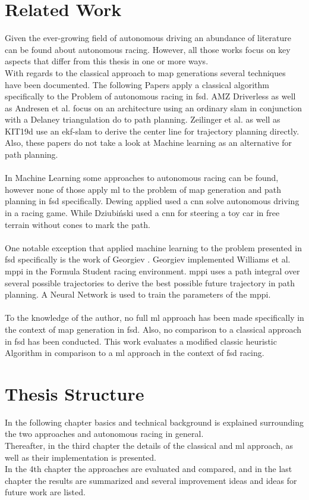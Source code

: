 \section{Related Work}
Given the ever-growing field of autonomous driving an abundance of literature can be found about autonomous racing. However, all those works focus on key aspects that differ from this thesis in one or more ways. \\
With regards to the classical approach to map generations several techniques have been documented. The following Papers apply a classical algorithm specifically to the Problem of autonomous racing in \ac{fsd}. AMZ Driverless \cite{kabzan2019amz} as well as Andresen et al. \cite{andresen2020} focus on an architecture using an ordinary \ac{slam} in conjunction with a Delaney triangulation do to path planning. Zeilinger et al. \cite{zeilinger2017} as well as KIT19d \cite{nekkah2020} use an \ac{ekf}-\ac{slam} to derive the center line for trajectory planning directly. Also, these papers do not take a look at Machine learning as an alternative for path planning.\\
\\
In Machine Learning some approaches to autonomous racing can be found, however none of those apply \ac{ml} to the problem of map generation and path planning in \ac{fsd} specifically. Dewing \cite{DewingNowTI} applied
used a \ac{cnn} solve autonomous driving in a racing game. While Dziubiński \cite{dziubinski_2019} used a \ac{cnn} for steering a toy car in free terrain without cones to mark the path.\\
\\
One notable exception that applied machine learning to the problem presented in \ac{fsd} specifically is the work of Georgiev \cite{georgiev2019}. Georgiev implemented Williams et al. \cite{williams2016} \ac{mppi} in the Formula Student racing environment. \ac{mppi} uses a path integral over several possible trajectories to derive the best possible future trajectory in path planning. A Neural Network is used to train the parameters of the \ac{mppi}.\\
\\
To the knowledge of the author, no full \ac{ml} approach has been made specifically in the context of map generation in \ac{fsd}. Also, no comparison to a classical approach in \ac{fsd} has been conducted. This work evaluates a modified classic heuristic Algorithm in comparison to a \ac{ml} approach in the context of \ac{fsd} racing.

\section{Thesis Structure}
In the following chapter basics and technical background is explained surrounding the two approaches and autonomous racing in general.\\
Thereafter, in the third chapter the details of the classical and \ac{ml} approach, as well as their implementation is presented.\\
In the 4th chapter the approaches are evaluated and compared,
and in the last chapter the results are summarized and several improvement ideas and ideas for future work are listed.

